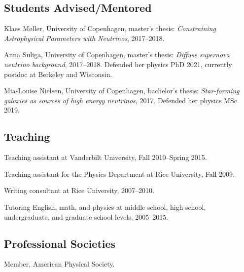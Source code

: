 \documentclass{article}
\renewenvironment{itemize}{
\begin{list}{}{
\setlength{\leftmargin}{.5em}}}{
\end{list}}
\begin{document}
\subsection*{Students Advised/Mentored}
\begin{itemize}
\item Klaes M\o ller, University of Copenhagen, master's thesis: \emph{Constraining Astrophysical Parameters with Neutrinos}, 2017--2018.
\item Anna Suliga, University of Copenhagen, master's thesis: \emph{Diffuse supernova neutrino background}, 2017--2018.
Defended her physics PhD 2021, currently postdoc at Berkeley and Wisconsin.
\item Mia-Louise Nielsen, University of Copenhagen, bachelor's thesis: \emph{Star-forming galaxies as sources of high energy neutrinos}, 2017.
Defended her physics MSc 2019.
\end{itemize}

\subsection*{Teaching}
\begin{itemize}
\item Teaching assistant at Vanderbilt University, Fall 2010--Spring 2015.
\item Teaching assistant for the Physics Department at Rice University, Fall 2009.
\item Writing consultant at Rice University, 2007--2010.
\item Tutoring English, math, and physics at middle school, high school, undergraduate, and graduate school levels, 2005--2015.
\end{itemize}

\subsection*{Professional Societies}
\begin{itemize}
\item Member, American Physical Society.
\end{itemize}
\end{document}
